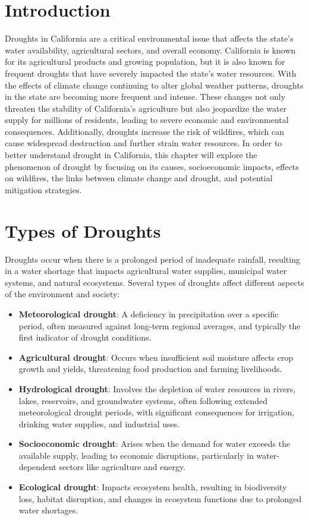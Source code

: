 \documentclass[
]{book}
\providecommand{\tightlist}{%
  \setlength{\itemsep}{0pt}\setlength{\parskip}{0pt}}
\theoremstyle{definition}
\theoremstyle{definition}
\theoremstyle{definition}
\theoremstyle{definition}
\theoremstyle{remark}
\begin{document}
\section{Introduction}\label{introduction}

Droughts in California are a critical environmental issue that affects the state's water availability, agricultural sectors, and overall economy. California is known for its agricultural products and growing population, but it is also known for frequent droughts that have severely impacted the state's water resources. With the effects of climate change continuing to alter global weather patterns, droughts in the state are becoming more frequent and intense. These changes not only threaten the stability of California's agriculture but also jeopardize the water supply for millions of residents, leading to severe economic and environmental consequences. Additionally, droughts increase the risk of wildfires, which can cause widespread destruction and further strain water resources. In order to better understand drought in California, this chapter will explore the phenomenon of drought by focusing on its causes, socioeconomic impacts, effects on wildfires, the links between climate change and drought, and potential mitigation strategies.

\section{Types of Droughts}\label{types-of-droughts}

Droughts occur when there is a prolonged period of inadequate rainfall, resulting in a water shortage that impacts agricultural water supplies, municipal water systems, and natural ecosystems. Several types of droughts affect different aspects of the environment and society:

\begin{itemize}
\tightlist
\item
  \textbf{Meteorological drought}: A deficiency in precipitation over a specific period, often measured against long-term regional averages, and typically the first indicator of drought conditions.
\item
  \textbf{Agricultural drought}: Occurs when insufficient soil moisture affects crop growth and yields, threatening food production and farming livelihoods.
\item
  \textbf{Hydrological drought}: Involves the depletion of water resources in rivers, lakes, reservoirs, and groundwater systems, often following extended meteorological drought periods, with significant consequences for irrigation, drinking water supplies, and industrial uses.
\item
  \textbf{Socioeconomic drought}: Arises when the demand for water exceeds the available supply, leading to economic disruptions, particularly in water-dependent sectors like agriculture and energy.
\item
  \textbf{Ecological drought}: Impacts ecosystem health, resulting in biodiversity loss, habitat disruption, and changes in ecosystem functions due to prolonged water shortages.
\end{itemize}
\end{document}
